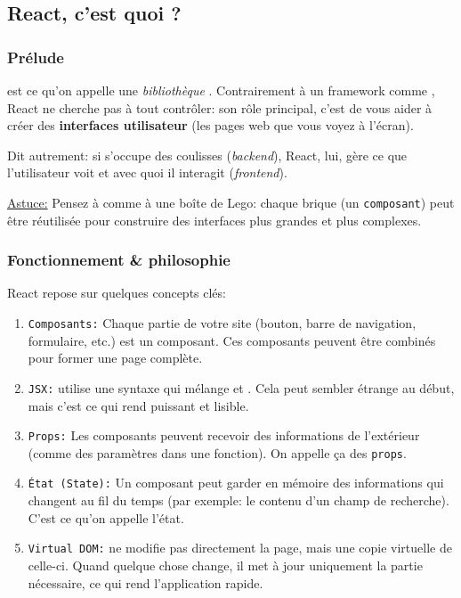 \subsection{React, c'est quoi ?}

\subsubsection[Prélude]{Prélude}

\react{} est ce qu’on appelle une \textit{bibliothèque \js{}}. Contrairement à un framework comme \laravel{}{}, React ne cherche pas à tout contrôler: son rôle principal, c’est de vous aider à créer des \textbf{interfaces utilisateur} (les pages web que vous voyez à l’écran). 

Dit autrement: si \laravel{} s’occupe des coulisses (\textit{backend}), React, lui, gère ce que l’utilisateur voit et avec quoi il interagit (\textit{frontend}). 

\underline{Astuce:} Pensez à \react{} comme à une boîte de Lego: chaque brique (un \texttt{composant}) peut être réutilisée pour construire des interfaces plus grandes et plus complexes.

\subsubsection[Fonctionnement et philosophie]{Fonctionnement \& philosophie}

React repose sur quelques concepts clés:

\begin{enumerate}
    \item \texttt{Composants:} Chaque partie de votre site (bouton, barre de navigation, formulaire, etc.) est un composant. Ces composants peuvent être combinés pour former une page complète.
    \item \texttt{JSX:} \react{} utilise une syntaxe qui mélange \js{} et \html{}. Cela peut sembler étrange au début, mais c’est ce qui rend \react{} puissant et lisible.
    \item \texttt{Props:} Les composants peuvent recevoir des informations de l’extérieur (comme des paramètres dans une fonction). On appelle ça des \texttt{props}.
    \item \texttt{État (State):} Un composant peut garder en mémoire des informations qui changent au fil du temps (par exemple: le contenu d’un champ de recherche). C’est ce qu’on appelle l’état.
    \item \texttt{Virtual DOM:} \react{} ne modifie pas directement la page, mais une copie virtuelle de celle-ci. Quand quelque chose change, il met à jour uniquement la partie nécessaire, ce qui rend l’application rapide.
\end{enumerate}

